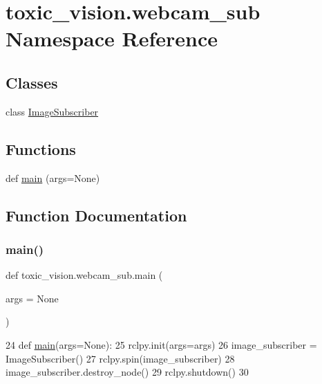 \hypertarget{namespacetoxic__vision_1_1webcam__sub}{}\section{toxic\+\_\+vision.\+webcam\+\_\+sub Namespace Reference}
\label{namespacetoxic__vision_1_1webcam__sub}
\subsection*{Classes}
\begin{DoxyCompactItemize}
\item 
class \mbox{\hyperlink{classtoxic__vision_1_1webcam__sub_1_1ImageSubscriber}{Image\+Subscriber}}
\end{DoxyCompactItemize}
\subsection*{Functions}
\begin{DoxyCompactItemize}
\item 
def \mbox{\hyperlink{namespacetoxic__vision_1_1webcam__sub_ae5a86a4c83b069a7d8ab88d2836d2e6e}{main}} (args=None)
\end{DoxyCompactItemize}


\subsection{Function Documentation}
\mbox{\label{namespacetoxic__vision_1_1webcam__sub_ae5a86a4c83b069a7d8ab88d2836d2e6e}} 
\subsubsection{\texorpdfstring{main()}{main()}}
{\footnotesize\ttfamily def toxic\+\_\+vision.\+webcam\+\_\+sub.\+main (\begin{DoxyParamCaption}\item[{}]{args = {\ttfamily None} }\end{DoxyParamCaption})}


\begin{DoxyCode}
24 \textcolor{keyword}{def }\mbox{\hyperlink{namespacetoxic__vision_1_1webcam__sub_ae5a86a4c83b069a7d8ab88d2836d2e6e}{main}}(args=None):
25   rclpy.init(args=args)
26   image\_subscriber = ImageSubscriber()
27   rclpy.spin(image\_subscriber)
28   image\_subscriber.destroy\_node()
29   rclpy.shutdown()
30   
\end{DoxyCode}
